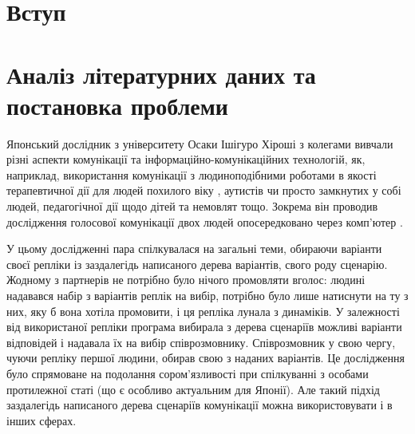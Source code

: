 \section{Вступ}



\section{Аналіз літературних даних та постановка проблеми}
Японський дослідник з університету Осаки Ішігуро Хіроші з колегами вивчали різні аспекти комунікації та інформаційно-комунікаційних технологій, як, наприклад, використання комунікації з людиноподібними роботами в якості терапевтичної дії для людей похилого віку \cite{Nishio_2015}, аутистів \cite{Kumazaki_2016} чи просто замкнутих у собі людей, педагогічної дії щодо дітей та немовлят \cite{Park_2015} тощо. Зокрема він проводив дослідження голосової комунікації двох людей опосередковано через комп’ютер \cite{Ishiguro_2016}. 

У цьому дослідженні пара спілкувалася на загальні теми, обираючи варіанти своєї репліки із заздалегідь написаного дерева варіантів, свого роду сценарію. Жодному з партнерів не потрібно було нічого промовляти вголос: людині надавався набір з варіантів реплік на вибір, потрібно було лише натиснути на ту з них, яку б вона хотіла  промовити, і ця репліка лунала з динаміків. У залежності від використаної репліки програма вибирала з дерева сценаріїв можливі варіанти відповідей і надавала їх на вибір співрозмовнику. Співрозмовник у свою чергу, чуючи репліку першої людини, обирав свою з наданих варіантів. Це дослідження було спрямоване на подолання сором’язливості при спілкуванні з особами протилежної статі (що є особливо актуальним для Японії). Але такий підхід заздалегідь написаного дерева сценаріїв комунікації можна використовувати і в інших сферах.

